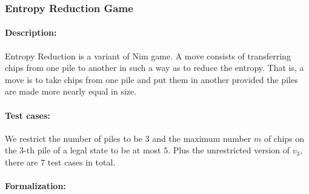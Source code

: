 \documentclass[review]{elsarticle}
\begin{document}
\subsubsection{Entropy Reduction Game \protect\cite{Fer1998}}

\paragraph{Description:} 
Entropy Reduction is a variant of Nim game.
A move consists of transferring chips from one pile to another in such a way as to reduce the entropy. 
That is, a move is to take chips from one pile and put them in another provided the piles are made more nearly equal in size. 

\paragraph{Test cases:}
We restrict the number of piles to be $3$ and the maximum number $m$ of chips on the $3$-th pile  of a legal state to be at most $5$.
Plus the unrestricted version of $v_3$, there are $7$ test cases in total.


\paragraph{Formalization:}
\end{document}
